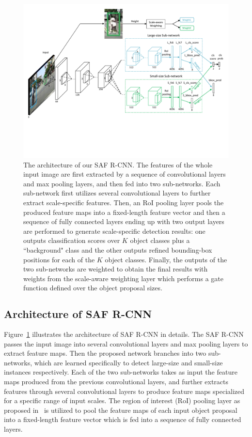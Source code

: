 \documentclass[journal]{IEEEtran}
\begin{document}
\begin{figure}
	\begin{center}
		\includegraphics[scale=0.50]{figures/architecture.pdf}
		\caption{{The architecture of our SAF R-CNN. The features of the whole input image are first extracted by a sequence of convolutional layers and max pooling layers, and then fed into two sub-networks. Each sub-network first utilizes several convolutional layers to further extract scale-specific features. Then, an RoI pooling layer pools the produced feature maps into a fixed-length feature vector and then a sequence of fully connected layers ending up with two output layers are performed to generate scale-specific detection results: one outputs classification scores over $K$ object classes plus a ``background" class and the other outputs refined bounding-box positions for each of the $K$ object classes. Finally, the outputs of the two sub-networks are weighted to obtain the final results with weights from the scale-aware weighting layer which performs a gate function defined over the object proposal sizes.}}	
		\label{fig:architecture}
	\end{center}
	\vspace{-4mm}
\end{figure}

\subsection{Architecture of SAF R-CNN}
Figure~\ref{fig:architecture} illustrates the architecture of SAF R-CNN in details. The SAF R-CNN passes the input image into several convolutional layers and max pooling layers to extract feature maps. Then the proposed network branches into two sub-networks, which are learned specifically to detect large-size and small-size instances respectively. Each of the two sub-networks takes as input the feature maps produced from the previous convolutional layers, and further extracts features through several convolutional layers to produce feature maps specialized for a specific range of input scales. The region of interest (RoI) pooling layer as proposed in~\cite{girshick2015fast} is utilized to pool the feature maps of each input object proposal into a fixed-length feature vector which is fed into a sequence of fully connected layers.
\end{document}
